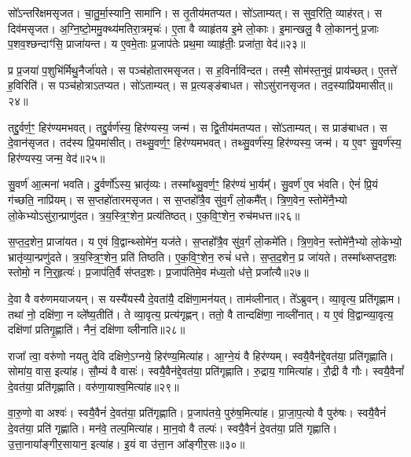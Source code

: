 सो᳚ऽन्तरि॑क्षम\-सृजत।
चा॒तु॒र्मा॒स्यानि॒ सामा॑नि।
स तृ॒तीय॑मतप्यत।
सो॑ऽताम्यत्।
स सुव॒रिति॒ व्याह॑रत्।
स दिव॑म\-सृजत।
अ॒ग्नि॒ष्टो॒ममु॒क्थ्य॑मतिरा॒त्रमृचः॑।
ए॒ता वै व्याहृ॑तय इ॒मे लो॒काः।
इ॒मान्खलु॒ वै लो॒काननु॑ प्र॒जाः प॒शव॒श्छन्दाꣳ॑सि॒ प्राजा॑यन्त।
य ए॒वमे॒ताः प्र॒जा\-प॑तेः प्रथ॒मा व्याहृ॑तीः॒ प्रजा॑ता॒ वेद॑॥२३॥\ip

प्र प्र॒जया॑ प॒शुभि॑र्मिथु॒नैर्जा॑यते।
स पञ्च॑होतारम\-सृजत।
स ह॒विर्नावि॑न्दत।
तस्मै॒ सोम॑स्त॒नुवं॒ प्राय॑च्छत्।
ए॒तत्ते॑ ह॒विरिति॑।
स पञ्च॑होत्रा\-ऽतप्यत।
सो॑ऽताम्यत्।
स प्र॒त्यङ्ङ॑बाधत।
सोऽसु॑रान\-सृजत।
तद॒स्याप्रि॑यमासीत्॥२४॥\ip

तद्दु॒र्वर्ण॒ꣳ॒ हिर॑ण्यमभवत्।
तद्दु॒र्वर्ण॑स्य॒ हिर॑ण्यस्य॒ जन्म॑।
स द्वि॒तीय॑मतप्यत।
सो॑ऽताम्यत्।
स प्राङ॑बाधत।
स दे॒वान॑\-सृजत।
तद॑स्य प्रि॒यमा॑सीत्।
तथ्सु॒वर्ण॒ꣳ॒ हिर॑ण्यमभवत्।
तथ्सु॒वर्ण॑स्य॒ हिर॑ण्यस्य॒ जन्म॑।
य ए॒वꣳ सु॒वर्ण॑स्य॒ हिर॑ण्यस्य॒ जन्म॒ वेद॑॥२५॥\ip

सु॒वर्ण॑ आ॒त्मना॑ भवति।
दु॒र्वर्णो᳚\-ऽस्य॒ भ्रातृ॑व्यः।
तस्मा᳚थ्सु॒वर्ण॒ꣳ॒ हिर॑ण्यं भा॒र्यम्᳚।
सु॒वर्ण॑ ए॒व भ॑वति।
ऐनं॑ प्रि॒यं ग॑च्छति॒ नाप्रि॑यम्।
स स॒प्तहो॑तारम\-सृजत।
स स॒प्तहो᳚त्रै॒व सु॑व॒र्गं लो॒कमै᳚त्।
त्रि॒ण॒वेन॒ स्तोमे॑नै॒भ्यो लो॒केभ्यो\-ऽसु॑रा॒न्प्राणु॑दत।
त्र॒य॒स्त्रि॒ꣳ॒शेन॒ प्रत्य॑तिष्ठत्।
ए॒क॒वि॒ꣳ॒शेन॒ रुच॑मधत्त॥२६॥\ip

स॒प्त॒द॒शेन॒ प्राजा॑यत।
य ए॒वं वि॒द्वान्थ्सोमे॑न॒ यज॑ते।
स॒प्तहो᳚त्रै॒व सु॑व॒र्गं लो॒कमे॑ति।
त्रि॒ण॒वेन॒ स्तोमे॑नै॒भ्यो लो॒केभ्यो॒ भ्रातृ॑व्या॒न्प्रणु॑दते।
त्र॒य॒स्त्रि॒ꣳ॒शेन॒ प्रति॑ तिष्ठति।
ए॒क॒वि॒ꣳ॒शेन॒ रुचं॑ धत्ते।
स॒प्त॒द॒शेन॒ प्र जा॑यते।
तस्मा᳚थ्सप्तद॒शः स्तोमो॒ न नि॒र्॒हृत्यः॑।
प्र॒जा\-प॑ति॒र्वै स॑प्तद॒शः।
प्र॒जा\-प॑तिमे॒व म॑ध्य॒तो ध॑त्ते॒ प्रजा᳚त्यै॥२७॥\ip\anuvakamend[अ॒न॒न्द॒द्भुव॒ इति॒ व्याह॑र॒द्वेदा॑सी॒द्वेदा॑धत्त॒ प्रजा᳚त्यै]

दे॒वा वै वरु॑णमयाजयन्।
स यस्यै॑यस्यै दे॒वता॑यै॒ दक्षि॑णा॒मन॑यत्।
ताम॑व्लीनात्।
ते᳚ऽब्रुवन्।
व्या॒वृत्य॒ प्रति॑\-गृह्णाम।
तथा॑ नो॒ दक्षि॑णा॒ न व्ले᳚ष्य॒तीति॑।
ते व्या॒वृत्य॒ प्रत्य॑गृह्णन्।
ततो॒ वै तान्दक्षि॑णा॒ नाव्ली॑नात्।
य ए॒वं वि॒द्वान्व्या॒वृत्य॒ दक्षि॑णां प्रति\-गृ॒ह्णाति॑।
नैनं॒ दक्षि॑णा व्लीनाति॥२८॥\ip

राजा᳚ त्वा॒ वरु॑णो नयतु देवि दक्षिणे॒\-ऽग्नये॒ हिर॑ण्य॒मित्या॑ह।
आ॒ग्ने॒यं वै हिर॑ण्यम्।
स्वयै॒वैन॑द्दे॒वत॑या॒ प्रति॑\-गृह्णाति।
सोमा॑य॒ वास॒ इत्या॑ह।
सौ॒म्यं वै वासः॑।
स्वयै॒वैन॑द्दे॒वत॑या॒ प्रति॑\-गृह्णाति।
रु॒द्राय॒ गामित्या॑ह।
रौ॒द्री वै गौः।
स्वयै॒वैनां᳚ दे॒वत॑या॒ प्रति॑\-गृह्णाति।
वरु॑णा॒याश्व॒मित्या॑ह॥२९॥\ip

वा॒रु॒णो वा अश्वः॑।
स्वयै॒वैनं॑ दे॒वत॑या॒ प्रति॑\-गृह्णाति।
प्र॒जा\-प॑तये॒ पुरु॑ष॒मित्या॑ह।
प्रा॒जा॒प॒त्यो वै पुरु॑षः।
स्वयै॒वैनं॑ दे॒वत॑या॒ प्रति॑ गृह्णाति।
मन॑वे॒ तल्प॒मित्या॑ह।
मा॒न॒वो वै तल्पः॑।
स्वयै॒वैनं॑ दे॒वत॑या॒ प्रति॑ गृह्णाति।
उ॒त्ता॒नाया᳚ङ्गीर॒सायान॒ इत्या॑ह।
इ॒यं वा उ॑त्ता॒न आ᳚ङ्गीर॒सः॥३०॥\ip

